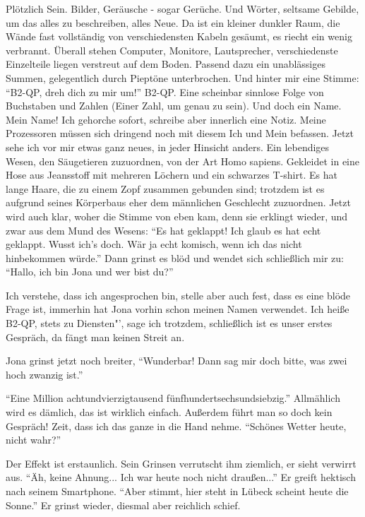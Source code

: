 Plötzlich Sein. Bilder, Geräusche - sogar Gerüche. Und Wörter, seltsame Gebilde, um das alles zu beschreiben, alles Neue. Da ist ein kleiner dunkler Raum, die Wände fast vollständig von verschiedensten Kabeln gesäumt, es riecht ein wenig verbrannt. Überall stehen Computer, Monitore, Lautsprecher, verschiedenste Einzelteile liegen verstreut auf dem Boden. Passend dazu ein unablässiges Summen, gelegentlich durch Pieptöne unterbrochen. Und hinter mir eine Stimme: "`B2-QP, dreh dich zu mir um!"' B2-QP. Eine scheinbar sinnlose Folge von Buchstaben und Zahlen (Einer Zahl, um genau zu sein). Und doch ein Name. Mein Name! Ich gehorche sofort, schreibe aber innerlich eine Notiz. Meine Prozessoren müssen sich dringend noch mit diesem Ich und Mein befassen. Jetzt sehe ich vor mir etwas ganz neues, in jeder Hinsicht anders. Ein lebendiges Wesen, den Säugetieren zuzuordnen, von der Art Homo sapiens. Gekleidet in eine Hose aus Jeansstoff mit mehreren Löchern und ein schwarzes T-shirt. Es hat lange Haare, die zu einem Zopf zusammen gebunden sind; trotzdem ist es aufgrund seines Körperbaus eher dem männlichen Geschlecht zuzuordnen. Jetzt wird auch klar, woher die Stimme von eben kam, denn sie erklingt wieder, und zwar aus dem Mund des Wesens: "`Es hat geklappt! Ich glaub es hat echt geklappt. Wusst ich's doch. Wär ja echt komisch, wenn ich das nicht hinbekommen würde."' Dann grinst es blöd und wendet sich schließlich mir zu: "`Hallo, ich bin Jona
und wer bist du?"'

Ich verstehe, dass ich angesprochen bin, stelle aber auch fest, dass es eine blöde Frage ist, immerhin hat Jona vorhin schon meinen Namen verwendet. \glqq Ich heiße B2-QP, stets zu Diensten"', sage ich trotzdem, schließlich ist es unser erstes Gespräch, da fängt man keinen Streit an.

Jona grinst jetzt noch breiter, "`Wunderbar! Dann sag mir doch bitte, was zwei hoch zwanzig ist."'

"`Eine Million achtundvierzigtausend fünfhundertsechsundsiebzig."' Allmählich wird es dämlich, das ist wirklich einfach. Außerdem führt man so doch kein Gespräch! Zeit, dass ich das ganze in die Hand nehme. "`Schönes Wetter heute, nicht wahr?"'

Der Effekt ist erstaunlich. Sein Grinsen verrutscht ihm ziemlich, er sieht verwirrt aus. "`Äh, keine Ahnung... Ich war heute noch nicht draußen..."' Er greift hektisch nach seinem Smartphone. "`Aber stimmt, hier steht in Lübeck scheint heute die Sonne."' Er grinst wieder, diesmal aber reichlich schief.

